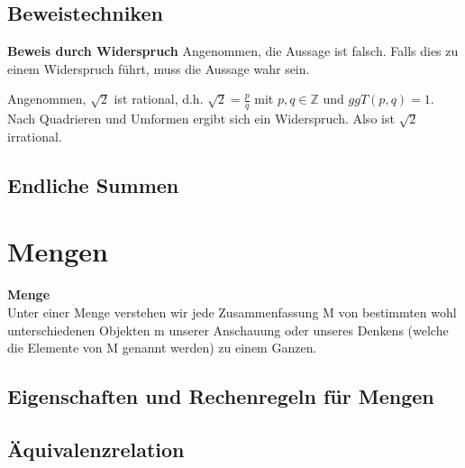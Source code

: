 \documentclass[a4paper,10pt]{article}
\begin{document}
\subsection{Beweistechniken}

\begin{satzbox}
\textbf{Beweis durch Widerspruch} 
\newline Angenommen, die Aussage ist falsch. Falls dies zu einem Widerspruch führt, muss die Aussage wahr sein.
\end{satzbox}

\begin{beweisbox}
Angenommen, $\sqrt{2}$ ist rational, d.h. $\sqrt{2} = \frac{p}{q}$ mit $p, q \in \mathbb{Z}$ und $ggT(p,q) = 1$. Nach Quadrieren und Umformen ergibt sich ein Widerspruch. Also ist $\sqrt{2}$ irrational.
\end{beweisbox}

\subsection{Endliche Summen}





\section{Mengen}


\begin{definitionbox}
\textbf{Menge} \\
Unter einer Menge verstehen wir jede Zusammenfassung M von bestimmten wohl unterschiedenen Objekten m unserer Anschauung oder unseres Denkens (welche die Elemente von M genannt werden) zu einem Ganzen.
\end{definitionbox}


\subsection{Eigenschaften und Rechenregeln für Mengen}
\subsection{Äquivalenzrelation}

\end{document}
